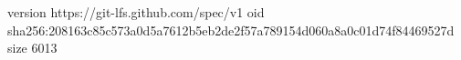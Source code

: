 version https://git-lfs.github.com/spec/v1
oid sha256:208163c85c573a0d5a7612b5eb2de2f57a789154d060a8a0c01d74f84469527d
size 6013
